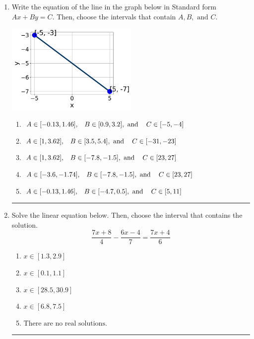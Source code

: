 \documentclass[14pt]{extbook}
\newcommand{\litem}[1]{\item#1\hspace*{-1cm}\rule{\textwidth}{0.4pt}}
\begin{document}
\begin{enumerate}
{\begin{enumerate}[label=\Alph*.]
\end{enumerate} }
\litem{
Write the equation of the line in the graph below in Standard form $Ax+By=C$. Then, choose the intervals that contain $A, B, \text{ and } C$.
\begin{center}
    \includegraphics[width=0.5\textwidth]{../Figures/linearGraphToStandardCopyB.png}
\end{center}
\begin{enumerate}[label=\Alph*.]
\item \( A \in [-0.13, 1.46], \hspace{3mm} B \in [0.9, 3.2], \text{ and } \hspace{3mm} C \in [-5, -4] \)
\item \( A \in [1, 3.62], \hspace{3mm} B \in [3.5, 5.4], \text{ and } \hspace{3mm} C \in [-31, -23] \)
\item \( A \in [1, 3.62], \hspace{3mm} B \in [-7.8, -1.5], \text{ and } \hspace{3mm} C \in [23, 27] \)
\item \( A \in [-3.6, -1.74], \hspace{3mm} B \in [-7.8, -1.5], \text{ and } \hspace{3mm} C \in [23, 27] \)
\item \( A \in [-0.13, 1.46], \hspace{3mm} B \in [-4.7, 0.5], \text{ and } \hspace{3mm} C \in [5, 11] \)

\end{enumerate} }
\litem{
Solve the linear equation below. Then, choose the interval that contains the solution.\[ \frac{7x + 8}{4} - \frac{6x -4}{7} = \frac{7x + 4}{6} \]\begin{enumerate}[label=\Alph*.]
\item \( x \in [1.3, 2.9] \)
\item \( x \in [0.1, 1.1] \)
\item \( x \in [28.5, 30.9] \)
\item \( x \in [6.8, 7.5] \)
\item \( \text{There are no real solutions.} \)


\end{enumerate}}
\end{enumerate}
\end{document}
